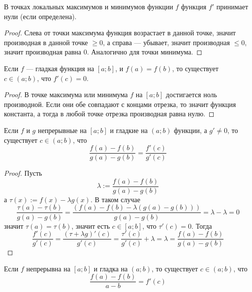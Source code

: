 \documentclass[12pt,a4paper]{article}
\begin{document}
    \begin{theorem}
        В точках локальных максимумов и минимумов функции $f$ функция $f'$ принимает нули (если определена).
    \end{theorem}

    \begin{proof}
        Слева от точки максимума функция возрастает в данной точке, значит производная в данной точке $\geqslant 0$, а справа --- убывает, значит производная $\leqslant 0$, значит производная равна $0$. Аналогично для точки минимума.
    \end{proof}

    \begin{theorem}[Ролль]
        Если $f$ --- гладкая функция на $[a; b]$, и $f(a) = f(b)$, то существует $c \in (a; b)$, что $f'(c) = 0$.
    \end{theorem}

    \begin{proof}
        В точке максимума или минимума $f$ на $[a;b]$ достигается ноль производной. Если они обе совпадают с концами отрезка, то значит функция константа, а тогда в любой точке отрезка производная равна нулю.
    \end{proof}

    \begin{theorem}
        Если $f$ и $g$ непрерывные на $[a; b]$ и гладкие на $(a; b)$ функции, а $g' \neq 0$, то существует $c \in (a; b)$, что
        \[\frac{f(a) - f(b)}{g(a) - g(b)} = \frac{f'(c)}{g'(c)}\]
    \end{theorem}

    \begin{proof}
        Пусть
        \[\lambda := \frac{f(a) - f(b)}{g(a) - g(b)}\]
        а $\tau(x) := f(x) - \lambda g(x)$. В таком случае
        \[\frac{\tau(a) - \tau(b)}{g(a) - g(b)} = \frac{(f(a) - f(b) - \lambda (g(a) - g(b)))}{g(a) - g(b)} = \lambda - \lambda = 0\]
        значит $\tau(a) = \tau(b)$, значит есть $c \in [a; b]$, что $\tau'(c) = 0$. Тогда
        \[\frac{f'(c)}{g'(c)} = \frac{(\tau + \lambda g)'(c)}{g'(c)} = \frac{\tau'(c)}{g'(c)} + \lambda = \lambda = \frac{f(a) - f(b)}{g(a) - g(b)}\]
    \end{proof}

    \begin{theorem}[Лагранж]\label{Lagrange-theorem}
        Если $f$ непрерывна на $[a; b]$ и гладка на $(a; b)$, то существует $c \in (a; b)$, что
        \[\frac{f(a) - f(b)}{a - b} = f'(c)\]
    \end{theorem}
\end{document}
